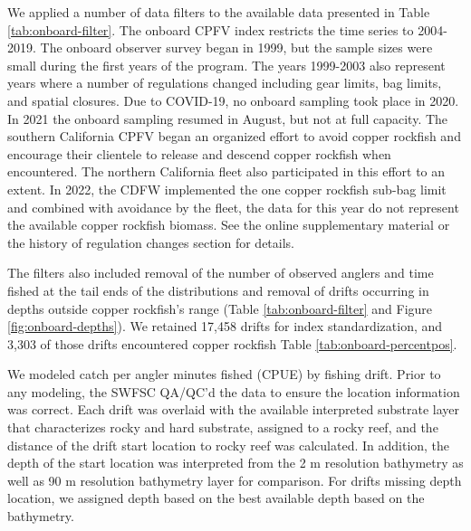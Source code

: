 \documentclass[11pt,
  letterpaper,
]{article}
\begin{document}
We applied a number of data filters to the available data presented in Table \ref{tab:onboard-filter}. The onboard CPFV index restricts the time series to 2004-2019. The onboard observer survey began in 1999, but the sample sizes were small during the first years of the program. The years 1999-2003 also represent years where a number of regulations changed including gear limits, bag limits, and spatial closures. Due to COVID-19, no onboard sampling took place in 2020. In 2021 the onboard sampling resumed in August, but not at full capacity. The southern California CPFV began an organized effort to avoid copper rockfish and encourage their clientele to release and descend copper rockfish when encountered. The northern California fleet also participated in this effort to an extent. In 2022, the CDFW implemented the one copper rockfish sub-bag limit and combined with avoidance by the fleet, the data for this year do not represent the available copper rockfish biomass. See the online supplementary material or the history of regulation changes section for details.

The filters also included removal of the number of observed anglers and time fished at the tail ends of the distributions and removal of drifts occurring in depths outside copper rockfish's range (Table \ref{tab:onboard-filter} and Figure \ref{fig:onboard-depths}). We retained 17,458 drifts for index standardization, and 3,303 of those drifts encountered copper rockfish Table \ref{tab:onboard-percentpos}.

We modeled catch per angler minutes fished (CPUE) by fishing drift. Prior to any modeling, the SWFSC QA/QC'd the data to ensure the location information was correct. Each drift was overlaid with the available interpreted substrate layer that characterizes rocky and hard substrate, assigned to a rocky reef, and the distance of the drift start location to rocky reef was calculated. In addition, the depth of the start location was interpreted from the 2 m resolution bathymetry as well as 90 m resolution bathymetry layer for comparison. For drifts missing depth location, we assigned depth based on the best available depth based on the bathymetry.
\end{document}
